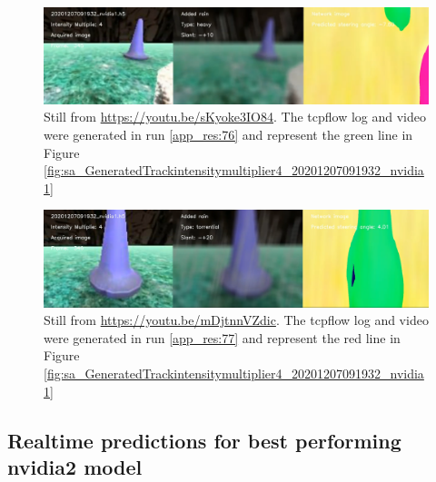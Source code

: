 \begin{figure}[h!]
 \centering 
 \includegraphics[width=\textwidth]{Figures/youtube20201207091932nvidia1heavy10mult_4_h5.png}
 \caption{Still from \url{https://youtu.be/sKyoke3IO84}. The tcpflow log and video were generated in run \ref{app_res:76} and represent the green line in Figure \ref{fig:sa_GeneratedTrackintensitymultiplier4_20201207091932_nvidia1}}
 \label{fig:youtube20201207091932nvidia1heavy10mult_4_h5} 
\end{figure}


\begin{figure}[h!]
 \centering 
 \includegraphics[width=\textwidth]{Figures/youtube20201207091932nvidia1torrential20mult_4_h5.png}
 \caption{Still from \url{https://youtu.be/mDjtnnVZdic}. The tcpflow log and video were generated in run \ref{app_res:77} and represent the red line in Figure \ref{fig:sa_GeneratedTrackintensitymultiplier4_20201207091932_nvidia1}}
 \label{fig:youtube20201207091932nvidia1torrential20mult_4_h5} 
\end{figure}



\subsection{Realtime predictions for best performing nvidia2 model}

